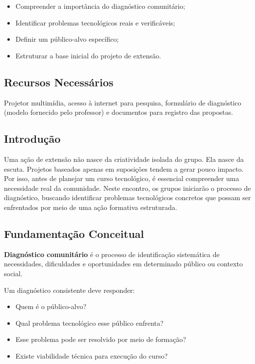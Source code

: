 \documentclass[12pt,a4paper]{article}
\begin{document}
\begin{tcolorbox}[boxObjetivos]
\begin{itemize}
    \item Compreender a importância do diagnóstico comunitário;
    \item Identificar problemas tecnológicos reais e verificáveis;
    \item Definir um público-alvo específico;
    \item Estruturar a base inicial do projeto de extensão.
\end{itemize}
\end{tcolorbox}

\subsection*{Recursos Necessários}

Projetor multimídia, acesso à internet para pesquisa, formulário de diagnóstico (modelo fornecido pelo professor) e documentos para registro das propostas.

\subsection*{Introdução}

Uma ação de extensão não nasce da criatividade isolada do grupo. Ela nasce da escuta. Projetos baseados apenas em suposições tendem a gerar pouco impacto. Por isso, antes de planejar um curso tecnológico, é essencial compreender uma necessidade real da comunidade. Neste encontro, os grupos iniciarão o processo de diagnóstico, buscando identificar problemas tecnológicos concretos que possam ser enfrentados por meio de uma ação formativa estruturada.

\subsection*{Fundamentação Conceitual}

\textbf{Diagnóstico comunitário} é o processo de identificação sistemática de necessidades, dificuldades e oportunidades em determinado público ou contexto social.

Um diagnóstico consistente deve responder:

\begin{itemize}
    \item Quem é o público-alvo?
    \item Qual problema tecnológico esse público enfrenta?
    \item Esse problema pode ser resolvido por meio de formação?
    \item Existe viabilidade técnica para execução do curso?
\end{itemize}
\end{document}
